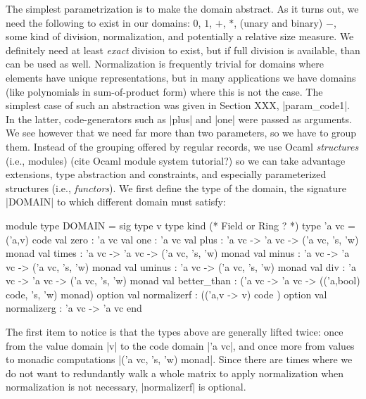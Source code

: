 \documentclass{llncs}
\begin{document}
The simplest parametrization is to make the domain abstract. As it 
turns out, we need the following to exist in our domains:  $0$, $1$,
$+$, $*$, (unary and binary) $-$, some kind of division, normalization,
and potentially a relative size measure.  We definitely need at least
\emph{exact} division to exist, but if full division is available, than
can be used as well.  Normalization is frequently trivial for domains
where elements have unique representations, but in many applications
we have domains (like polynomials in sum-of-product form) where this
is not the case.  The simplest case of such an abstraction was given
in Section XXX, |param_code1|. In the latter, code-generators such as
|plus| and |one| were passed as arguments. We see however that we 
need far more than two parameters, so we have to group them. Instead
of the grouping offered by regular records, we use Ocaml
\emph{structures} (i.e., modules) (cite Ocaml module system tutorial?)
so we can take advantage extensions, type abstraction and constraints,
and especially parameterized structures (i.e., \emph{functors}).
We first define the type of the domain, the signature |DOMAIN| to which
different domain must satisfy:
\begin{small}
\begin{code}
module type DOMAIN = sig
  type v
  type kind (* Field or Ring ? *)
  type 'a vc = ('a,v) code
  val zero : 'a vc   val one : 'a vc
  val plus : 'a vc -> 'a vc -> ('a vc, 's, 'w) monad
  val times : 'a vc -> 'a vc -> ('a vc, 's, 'w) monad
  val minus : 'a vc -> 'a vc -> ('a vc, 's, 'w) monad
  val uminus : 'a vc -> ('a vc, 's, 'w) monad
  val div : 'a vc -> 'a vc -> ('a vc, 's, 'w) monad
  val better_than : ('a vc -> 'a vc -> 
      (('a,bool) code, 's, 'w) monad) option
  val normalizerf : (('a,v -> v) code ) option
  val normalizerg : 'a vc -> 'a vc
end 
\end{code}
\end{small}
\noindent  The first item to notice is that the types above are
generally lifted twice: once from the value domain |v| to the code
domain |'a vc|, and once more from values to monadic computations
|('a vc, 's, 'w) monad|.  Since there are times where we do not want
to redundantly walk a whole matrix to apply normalization when 
normalization is not necessary, |normalizerf| is optional.
\end{document}

